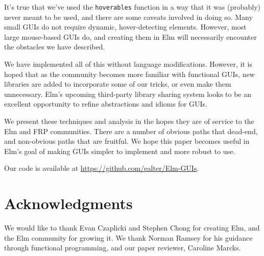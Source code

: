 \documentclass{article}
\begin{document}
It's true that we've used the \texttt{hoverables} function in a way that
it was (probably) never meant to be used, and there are some caveats
involved in doing so. Many small GUIs do not require dynamic,
hover-detecting elements. However, most large mouse-based GUIs do, and
creating them in Elm will necessarily encounter the obstacles we have
described.

We have implemented all of this without language modifications. However,
it is hoped that as the community becomes more familiar with functional
GUIs, new libraries are added to incorporate some of our tricks, or even
make them unnecessary. Elm's upcoming third-party library sharing system
looks to be an excellent opportunity to refine abstractions and idioms
for GUIs.

We present these techniques and analysis in the hopes they are of
service to the Elm and FRP communities. There are a number of obvious paths that
dead-end, and non-obvious paths that are fruitful. We hope this paper becomes
useful in Elm's goal of making GUIs simpler to implement and more robust
to use.

Our code is available at \url{https://github.com/ealter/Elm-GUIs}.

\section*{Acknowledgments}
We would like to thank Evan Czaplicki and Stephen Chong for creating
Elm, and the Elm community for growing it. We thank Norman Ramsey for
his guidance through functional programming, and our paper reviewer, Caroline
Marcks.



\end{document}
